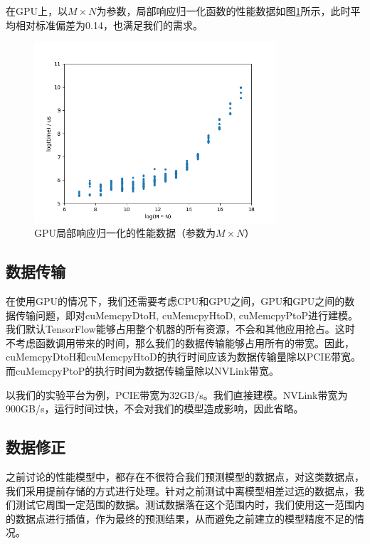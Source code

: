     在GPU上，以$ M \times N $为参数，局部响应归一化函数的性能数据如图\ref{fig:lrn_gpu}所示，此时平均相对标准偏差为0.14，也满足我们的需求。

    \begin{figure}[!htbp]
        \centering
        \includegraphics[width=0.8\textwidth]{figures/lrn_gpu.png}
        \caption{GPU局部响应归一化的性能数据（参数为$ M \times N $）}
        \label{fig:lrn_gpu}
    \end{figure}

\subsection{数据传输}
    在使用GPU的情况下，我们还需要考虑CPU和GPU之间，GPU和GPU之间的数据传输问题，即对cuMemcpyDtoH, cuMemcpyHtoD, cuMemcpyPtoP进行建模。
    我们默认TensorFlow能够占用整个机器的所有资源，不会和其他应用抢占。这时不考虑函数调用带来的时间，那么我们的数据传输能够占用所有的带宽。因此，cuMemcpyDtoH和cuMemcpyHtoD的执行时间应该为数据传输量除以PCIE带宽。而cuMemcpyPtoP的执行时间为数据传输量除以NVLink带宽。

    以我们的实验平台为例，PCIE带宽为32GB/s。我们直接建模。NVLink带宽为900GB/s，运行时间过快，不会对我们的模型造成影响，因此省略。

\subsection{数据修正}
    之前讨论的性能模型中，都存在不很符合我们预测模型的数据点，对这类数据点，我们采用提前存储的方式进行处理。针对之前测试中离模型相差过远的数据点，我们测试它周围一定范围的数据。测试数据落在这个范围内时，我们使用这一范围内的数据点进行插值，作为最终的预测结果，从而避免之前建立的模型精度不足的情况。
    
